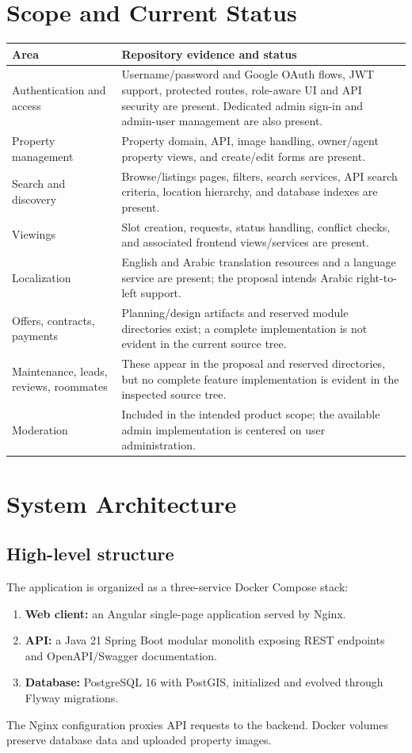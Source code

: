 \documentclass[11pt,a4paper]{article}
\begin{document}
\section{Scope and Current Status}
\begin{tabularx}{\textwidth}{@{}p{}X@{}}
\toprule
Area & Repository evidence and status \\
\midrule
Authentication and access & Username/password and Google OAuth flows, JWT support, protected routes, role-aware UI and API security are present. Dedicated admin sign-in and admin-user management are also present. \\
Property management & Property domain, API, image handling, owner/agent property views, and create/edit forms are present. \\
Search and discovery & Browse/listings pages, filters, search services, API search criteria, location hierarchy, and database indexes are present. \\
Viewings & Slot creation, requests, status handling, conflict checks, and associated frontend views/services are present. \\
Localization & English and Arabic translation resources and a language service are present; the proposal intends Arabic right-to-left support. \\
Offers, contracts, payments & Planning/design artifacts and reserved module directories exist; a complete implementation is not evident in the current source tree. \\
Maintenance, leads, reviews, roommates & These appear in the proposal and reserved directories, but no complete feature implementation is evident in the inspected source tree. \\
Moderation & Included in the intended product scope; the available admin implementation is centered on user administration. \\
\bottomrule
\end{tabularx}



\section{System Architecture}
\subsection{High-level structure}
The application is organized as a three-service Docker Compose stack:
\begin{enumerate}
  \item \textbf{Web client:} an Angular single-page application served by Nginx.
  \item \textbf{API:} a Java 21 Spring Boot modular monolith exposing REST endpoints and OpenAPI/Swagger documentation.
  \item \textbf{Database:} PostgreSQL 16 with PostGIS, initialized and evolved through Flyway migrations.
\end{enumerate}
The Nginx configuration proxies API requests to the backend. Docker volumes preserve database data and uploaded property images.
\end{document}
